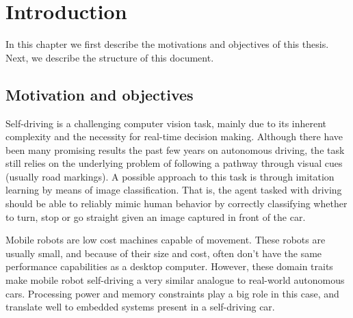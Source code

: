 \chapter{Introduction}\label{chp:introduction}


In this chapter we first describe the motivations and objectives of this thesis. Next, we describe
the structure of this document.

\section{Motivation and objectives}

Self-driving is a challenging computer vision task, mainly due to its inherent complexity and the
necessity for real-time decision making. Although there have been many promising results the past
few years on autonomous driving, the task still relies on the underlying problem of following a
pathway through visual cues (usually road markings). A possible approach to this task is through
imitation learning by means of image classification. That is, the agent tasked with driving should
be able to reliably mimic human behavior by correctly classifying whether to turn, stop or go
straight given an image captured in front of the car.

Mobile robots are low cost machines capable of movement. These robots are usually small, and
because of their size and cost, often don't have the same performance capabilities as a desktop
computer. However, these domain traits make mobile robot self-driving a very similar analogue to
real-world autonomous cars. Processing power and memory constraints play a big role in this case,
and translate well to embedded systems present in a self-driving car.

